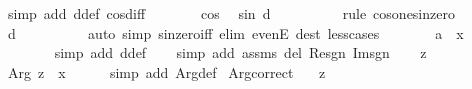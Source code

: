 \begin{isabellebody}
\ {\isacharparenleft}{\kern0pt}simp\ add{\isacharcolon}{\kern0pt}\ d{\isacharunderscore}{\kern0pt}def\ cos{\isacharunderscore}{\kern0pt}diff{\isacharparenright}{\kern0pt}\isanewline
\ \ \ \ \isamarkupfalse%
\ \isamarkupfalse%
\ cos\ \isamarkupfalse%
\ {\isachardoublequoteopen}sin\ d\ {\isacharequal}{\kern0pt}\ {}{\isachardoublequoteclose}\isanewline
\ \ \ \ \ \ \isamarkupfalse%
\ {\isacharparenleft}{\kern0pt}rule\ cos{\isacharunderscore}{\kern0pt}one{\isacharunderscore}{\kern0pt}sin{\isacharunderscore}{\kern0pt}zero{\isacharparenright}{\kern0pt}\isanewline
\ \ \ \ \isamarkupfalse%
\ \isamarkupfalse%
\ {\isachardoublequoteopen}d\ {\isacharequal}{\kern0pt}\ {}{\isachardoublequoteclose}\isanewline
\ \ \ \ \ \ \isamarkupfalse%
\ {\isacharparenleft}{\kern0pt}auto\ simp{\isacharcolon}{\kern0pt}\ sin{\isacharunderscore}{\kern0pt}zero{\isacharunderscore}{\kern0pt}iff\ elim{\isacharbang}{\kern0pt}{\isacharcolon}{\kern0pt}\ evenE\ dest{\isacharbang}{\kern0pt}{\isacharcolon}{\kern0pt}\ less{\isacharunderscore}{\kern0pt}{}{\isacharunderscore}{\kern0pt}cases{\isacharparenright}{\kern0pt}\isanewline
\ \ \ \ \isamarkupfalse%
\ \isamarkupfalse%
\ {\isachardoublequoteopen}a\ {\isacharequal}{\kern0pt}\ x{\isachardoublequoteclose}\isanewline
\ \ \ \ \ \ \isamarkupfalse%
\ {\isacharparenleft}{\kern0pt}simp\ add{\isacharcolon}{\kern0pt}\ d{\isacharunderscore}{\kern0pt}def{\isacharparenright}{\kern0pt}\isanewline
\ \ \isamarkupfalse%
\ {\isacharparenleft}{\kern0pt}simp\ add{\isacharcolon}{\kern0pt}\ assms\ del{\isacharcolon}{\kern0pt}\ Re{\isacharunderscore}{\kern0pt}sgn\ Im{\isacharunderscore}{\kern0pt}sgn{\isacharparenright}{\kern0pt}\isanewline
\ \ \isamarkupfalse%
\ {\isacartoucheopen}z\ {\isasymnoteq}\ {}{\isacartoucheclose}\ \isamarkupfalse%
\ {\isachardoublequoteopen}Arg\ z\ {\isacharequal}{\kern0pt}\ x{\isachardoublequoteclose}\isanewline
\ \ \ \ \isamarkupfalse%
\ {\isacharparenleft}{\kern0pt}simp\ add{\isacharcolon}{\kern0pt}\ Arg{\isacharunderscore}{\kern0pt}def{\isacharparenright}{\kern0pt}\isanewline
{}\isamarkupfalse%
%
\endisatagproof
{\isafoldproof}%
%
\isadelimproof
\isanewline
%
\endisadelimproof
\isanewline
{}\isamarkupfalse%
\ Arg{\isacharunderscore}{\kern0pt}correct{\isacharcolon}{\kern0pt}\isanewline
\ \ \ {\isachardoublequoteopen}z\ {\isasymnoteq}\ {}{\isachardoublequoteclose}\isanewline

\end{isabellebody}
